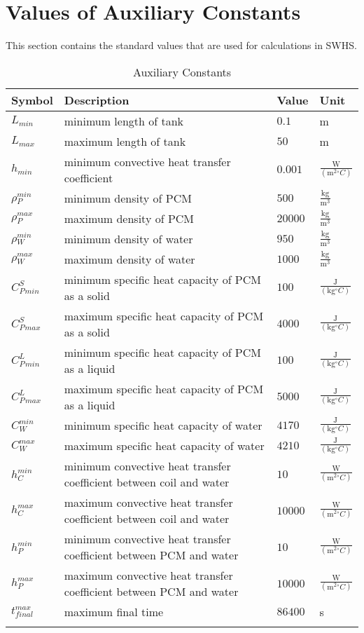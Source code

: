 \documentclass[12pt]{article}
\begin{document}
\section{Values of Auxiliary Constants}
\label{Sec:ValuofAuxiCons}
This section contains the standard values that are used for calculations in SWHS.
\begin{longtable}{l l l l}
\toprule
Symbol & Description & Value & Unit
\\
\midrule
$L_{min}$ & minimum length of tank & $0.1$ & m
\\
$L_{max}$ & maximum length of tank & $50$ & m
\\
$h_{min}$ & minimum convective heat transfer coefficient & $0.001$ & $\frac{\text{W}}{(\text{m}^{2}{}^{\circ}C)}$
\\
$\rho{}_{P}^{min}$ & minimum density of PCM & $500$ & $\frac{\text{kg}}{\text{m}^{3}}$
\\
$\rho{}_{P}^{max}$ & maximum density of PCM & $20000$ & $\frac{\text{kg}}{\text{m}^{3}}$
\\
$\rho{}_{W}^{min}$ & minimum density of water & $950$ & $\frac{\text{kg}}{\text{m}^{3}}$
\\
$\rho{}_{W}^{max}$ & maximum density of water & $1000$ & $\frac{\text{kg}}{\text{m}^{3}}$
\\
$C_{P}^{S}_{min}$ & minimum specific heat capacity of PCM as a solid & $100$ & $\frac{\text{J}}{(\text{kg}{}^{\circ}C)}$
\\
$C_{P}^{S}_{max}$ & maximum specific heat capacity of PCM as a solid & $4000$ & $\frac{\text{J}}{(\text{kg}{}^{\circ}C)}$
\\
$C_{P}^{L}_{min}$ & minimum specific heat capacity of PCM as a liquid & $100$ & $\frac{\text{J}}{(\text{kg}{}^{\circ}C)}$
\\
$C_{P}^{L}_{max}$ & maximum specific heat capacity of PCM as a liquid & $5000$ & $\frac{\text{J}}{(\text{kg}{}^{\circ}C)}$
\\
$C_{W}^{min}$ & minimum specific heat capacity of water & $4170$ & $\frac{\text{J}}{(\text{kg}{}^{\circ}C)}$
\\
$C_{W}^{max}$ & maximum specific heat capacity of water & $4210$ & $\frac{\text{J}}{(\text{kg}{}^{\circ}C)}$
\\
$h_{C}^{min}$ & minimum convective heat transfer coefficient between coil and water & $10$ & $\frac{\text{W}}{(\text{m}^{2}{}^{\circ}C)}$
\\
$h_{C}^{max}$ & maximum convective heat transfer coefficient between coil and water & $10000$ & $\frac{\text{W}}{(\text{m}^{2}{}^{\circ}C)}$
\\
$h_{P}^{min}$ & minimum convective heat transfer coefficient between PCM and water & $10$ & $\frac{\text{W}}{(\text{m}^{2}{}^{\circ}C)}$
\\
$h_{P}^{max}$ & maximum convective heat transfer coefficient between PCM and water & $10000$ & $\frac{\text{W}}{(\text{m}^{2}{}^{\circ}C)}$
\\
$t_{final}^{max}$ & maximum final time & $86400$ & s
\\
\bottomrule
\caption{Auxiliary Constants}
\label{Table:AuxiCons}
\end{longtable}
\end{document}
